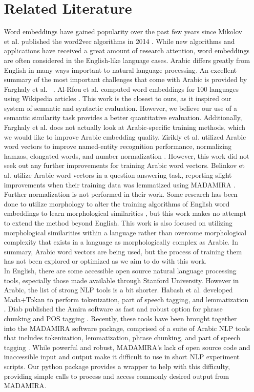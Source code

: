 \chapter{Related Literature}
\label{sec:literature}

Word embeddings have gained popularity over the past few years since Mikolov et al. published the word2vec algorithms in 2014 \cite{mikolovdist:2013,mikoloveffic:2013}. While new algorithms and applications have received a great amount of research attention, word embeddings are often considered in the English-like language cases. Arabic differs greatly from English in many ways important to natural language processing. An excellent summary of the most important challenges that come with Arabic is provided by Farghaly et al. ~\cite{farghaly:2009}. Al-Rfou et al. computed word embeddings for 100 languages using Wikipedia articles \cite{al:2013}. This work is the closest to ours, as it inspired our system of semantic and syntactic evaluation. However, we believe our use of a semantic similarity task provides a better quantitative evaluation. Additionally, Farghaly et al. does not actually look at Arabic-specific training methods, which we would like to improve Arabic embedding quality. Zirikly et al. utilized Arabic word vectors to improve named-entity recognition performance, normalizing hamzas, elongated words, and number normalization \cite{zirikly:2015}. However, this work did not seek out any further improvements for training Arabic word vectors. Belinkov et al. utilize Arabic word vectors in a question answering task, reporting slight improvements when their training data was lemmatized using MADAMIRA \cite{belinkov:2015}. Further normalization is not performed in their work. Some research has been done to utilize morphology to alter the training algorithms of English word embeddings to learn morphological similarities \cite{luong2013better}, but this work makes no attempt to extend the method beyond English. This work is also focused on utilizing morphological similarities within a language rather than overcome morphological complexity that exists in a language as morphologically complex as Arabic. In summary, Arabic word vectors are being used, but the process of training them has not been explored or optimized as we aim to do with this work.
\\
In English, there are some accessible open source natural language processing tools, especially those made available through Stanford University. However in Arabic, the list of strong NLP tools is a bit shorter. Habash et al. developed Mada+Tokan to perform tokenization, part of speech tagging, and lemmatization \cite{habash:2009}. Diab published the Amira software as fast and robust option for phrase chunking and POS tagging \cite{diab:2009}. Recently, these tools have been brought together into the MADAMIRA software package, comprised of a suite of Arabic NLP tools that includes tokenization, lemmatization, phrase chunking, and part of speech tagging \cite{pasha:2014}. While powerful and robust, MADAMIRA's lack of open source code and inaccessible input and output make it difficult to use in short NLP experiment scripts. Our python package provides a wrapper to help with this difficulty, providing simple calls to process and access commonly desired output from MADAMIRA.
